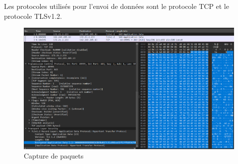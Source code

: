 \documentclass{article}
\begin{document}
Les protocoles utilisés pour l'envoi de données sont le protocole TCP et le protocole TLSv1.2.

\begin{figure}[H]
  \includegraphics[width=\linewidth]{envoiData.png}
  \caption{Capture de paquets}
  \label{fig:resRandomDog2}
\end{figure}
\end{document}

